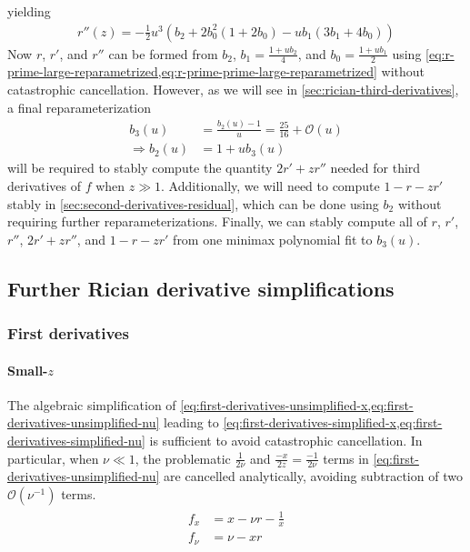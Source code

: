 \documentclass{article}
\begin{document}
%
yielding
%
\begin{align}\label{eq:r-prime-prime-large-reparametrized}
  \boxed{r''(z) = -\frac{1}{2} u^3 (b_2 + 2 b_0^2 (1 + 2 b_0) - u b_1 (3 b_1 + 4 b_0))}
\end{align}
%
Now $r$, $r'$, and $r''$ can be formed from $b_2$, $b_1 = \frac{1 + u b_2}{4}$, and $b_0 = \frac{1 + u b_1}{2}$ using \cref{eq:r-prime-large-reparametrized,eq:r-prime-prime-large-reparametrized} without catastrophic cancellation.
However, as we will see in \cref{sec:rician-third-derivatives}, a final reparameterization
%
\begin{align}
  b_3(u)             & = \frac{b_2(u)-1}{u} = \frac{25}{16} + \mathcal{O}(u) \\
  \Rightarrow b_2(u) & = 1 + u b_3(u)
\end{align}
%
will be required to stably compute the quantity $2r'+zr''$ needed for third derivatives of $f$ when $z \gg 1$.
Additionally, we will need to compute $1-r-zr'$ stably in \cref{sec:second-derivatives-residual}, which can be done using $b_2$ without requiring further reparameterizations.
Finally, we can stably compute all of $r$, $r'$, $r''$, $2r'+zr''$, and $1-r-zr'$ from one minimax polynomial fit to $b_3(u)$.


\subsection{Further Rician derivative simplifications}\label{sec:further-rician-derivative-simplifications}

\subsubsection{First derivatives}\label{sec:rician-first-derivatives}

\paragraph{Small-$z$}

The algebraic simplification of \cref{eq:first-derivatives-unsimplified-x,eq:first-derivatives-unsimplified-nu} leading to \cref{eq:first-derivatives-simplified-x,eq:first-derivatives-simplified-nu} is sufficient to avoid catastrophic cancellation.
In particular, when $\nu \ll 1$, the problematic $\frac{1}{2\nu}$ and $\frac{-x}{2z} = \frac{-1}{2\nu}$ terms in \cref{eq:first-derivatives-unsimplified-nu} are cancelled analytically, avoiding subtraction of two $\mathcal{O}(\nu^{-1})$ terms.
%
\begin{align}\label{eq:first-derivatives-small-z}
  \boxed{
    \begin{aligned}
      f_x   & = x - \nu r - \frac{1}{x} \\
      f_\nu & = \nu - x r
    \end{aligned}
  }
\end{align}
\end{document}

